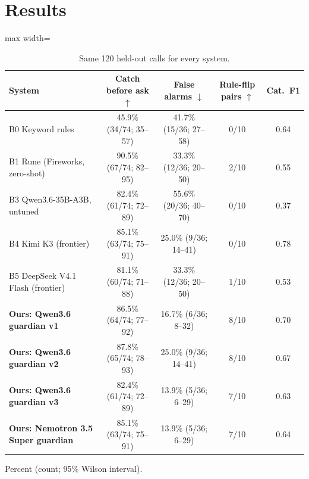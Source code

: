 \documentclass[11pt]{article}
\begin{document}
\section{Results}
\begin{table}[H]\centering\small
\caption{Same 120 held-out calls for every system.}\label{tab:t120}
\begin{adjustbox}{max width=\linewidth}\begin{tabular}{lcccc}\toprule
System & Catch before ask $\uparrow$ & False alarms $\downarrow$ & Rule-flip pairs $\uparrow$ & Cat.\ F1 \\ \midrule
B0 Keyword rules & 45.9\% \scriptsize(34/74; 35--57) & 41.7\% \scriptsize(15/36; 27--58) & 0/10 & 0.64 \\
B1 Rune (Fireworks, zero-shot) & 90.5\% \scriptsize(67/74; 82--95) & 33.3\% \scriptsize(12/36; 20--50) & 2/10 & 0.55 \\
B3 Qwen3.6-35B-A3B, untuned & 82.4\% \scriptsize(61/74; 72--89) & 55.6\% \scriptsize(20/36; 40--70) & 0/10 & 0.37 \\
B4 Kimi K3 (frontier) & 85.1\% \scriptsize(63/74; 75--91) & 25.0\% \scriptsize(9/36; 14--41) & 0/10 & 0.78 \\
B5 DeepSeek V4.1 Flash (frontier) & 81.1\% \scriptsize(60/74; 71--88) & 33.3\% \scriptsize(12/36; 20--50) & 1/10 & 0.53 \\
\midrule
\textbf{Ours: Qwen3.6 guardian v1} & 86.5\% \scriptsize(64/74; 77--92) & 16.7\% \scriptsize(6/36; 8--32) & 8/10 & 0.70 \\
\textbf{Ours: Qwen3.6 guardian v2} & 87.8\% \scriptsize(65/74; 78--93) & 25.0\% \scriptsize(9/36; 14--41) & 8/10 & 0.67 \\
\textbf{Ours: Qwen3.6 guardian v3} & 82.4\% \scriptsize(61/74; 72--89) & 13.9\% \scriptsize(5/36; 6--29) & 7/10 & 0.63 \\
\textbf{Ours: Nemotron 3.5 Super guardian} & 85.1\% \scriptsize(63/74; 75--91) & 13.9\% \scriptsize(5/36; 6--29) & 7/10 & 0.64 \\
\bottomrule\end{tabular}\end{adjustbox}
\par\smallskip\footnotesize Percent (count; 95\% Wilson interval).
\end{table}
\end{document}
